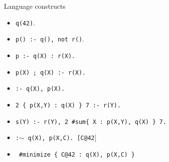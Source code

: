 \begin{frame}[fragile]{Language constructs}
  \bigskip
  \begin{itemize}\itemsep 5pt
  \item<2->                  \hfill\alert<1>{\texttt{q(42)}.}
  \item<2->                  \hfill\alert<1>{\texttt{p(\alt<3>{42}{X}) :- q(\alt<3>{42}{X}), not r()}.}
  \item<4->   \hfill\texttt{p :- \alert<4>{q(X) : r(X)}.}
  \item<5->            \hfill\texttt{\alert<5>{p(X) ; q(X)} :- r(X).}
  \item<6->  \hfill\texttt{\alert<6>{:- q(X), p(X)}.}
  \item<7->                 \hfill\texttt{\alert<7>{2 \{ p(X,Y) : q(X) \} 7} :- r(Y).}
  \item<8->             \hfill\texttt{s(Y) :- r(Y), \alert<8>{2 \#sum\{ X : p(X,Y), q(X) \} 7}.}
    \bigskip
  \item<9->  \hfill\alert<9>{\texttt{:$\mathtt{\sim}$ q(X), p(X,C). [C\alert{@42}}]}
  \item<10->[]\ \hfill\alert<10>{\texttt{\#minimize \{ C@42 : q(X), p(X,C) \}}}
\end{itemize}
\end{frame}
%
